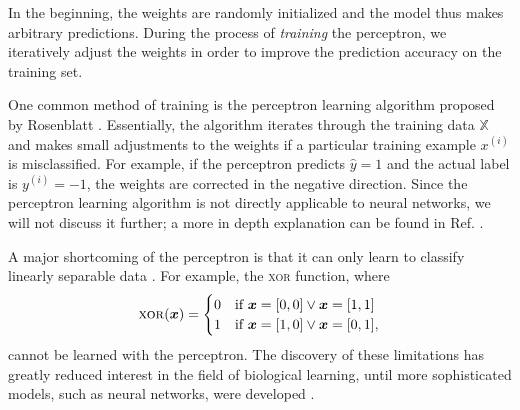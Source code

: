 In the beginning, the weights are randomly initialized and the model thus makes arbitrary predictions. During the process of \emph{training} the perceptron, we iteratively adjust the weights in order to improve the prediction accuracy on the training set.

One common method of training is the perceptron learning algorithm proposed by Rosenblatt \cite{Rosenblatt1958386}. Essentially, the algorithm iterates through the training data $\mathbb{X}$ and makes small adjustments to the weights if a particular training example $x^{(i)}$ is misclassified. For example, if the perceptron predicts $\hat{y} = 1$ and the actual label is $y^{(i)} = -1$, the weights are corrected in the negative direction. Since the perceptron learning algorithm is not directly applicable to neural networks, we will not discuss it further; a more in depth explanation can be found in Ref. \cite[Ch.\,8,\,pp.\,265-267]{DBLP:books/lib/Murphy12}.

A major shortcoming of the perceptron is that it can only learn to classify linearly separable data \cite{DBLP:books/daglib/0066902}. For example, the \textsc{xor} function, where 
\begin{equation}
\text{\textsc{xor}}(\bm{x}) = 
\begin{cases} 0 & \text{if }\bm{x} = [0,0] \lor \bm{x} = [1,1] 
			\\1 & \text{if }\bm{x} = [1,0] \lor \bm{x} = [0,1],
\end{cases}
\end{equation}
cannot be learned with the perceptron. The discovery of these limitations has greatly reduced interest in the field of biological learning, until more sophisticated models, such as neural networks, were developed \cite[Ch.\,1,\,pp.\,12-18]{DBLP:books/daglib/0040158}.